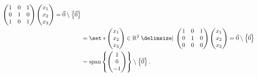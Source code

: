 \documentclass[main.tex]{subfiles}
\begin{document}
\begin{soln}
\begin{align*}
{\begin{pmatrix}
        1 & 0 & 1 \\
        0 & 1 & 0 \\
        1 & 0 & 1
    \end{pmatrix}\begin{pmatrix} x_1 \\ x_2 \\ x_3\end{pmatrix} = \vec{0}}\setminus \braces{\vec{0}} \\
    &= \set*{\begin{pmatrix} x_1 \\ x_2 \\ x_3\end{pmatrix} \in \RR^3\mid \begin{pmatrix}
        1 & 0 & 1 \\
        0 & 1 & 0 \\
        0 & 0 & 0
    \end{pmatrix}\begin{pmatrix} x_1 \\ x_2 \\ x_3\end{pmatrix} = \vec{0}}\setminus \braces{\vec{0}} \\
    &= \vspan\braces{\begin{pmatrix}
        1 \\
        0 \\
        -1
    \end{pmatrix}}\setminus \braces{\vec{0}}.
    \end{align*}


\end{soln}
\end{document}

